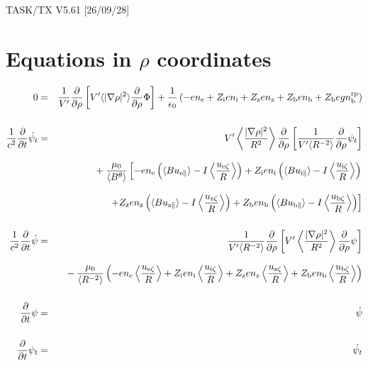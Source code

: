 \documentclass[11pt]{article}
\def\r#1{{\rm#1}}
\def\ave#1{\left\langle#1\right\rangle}
\def\aves#1{\langle#1\rangle}
\def\para{\parallel}
\def\ddrho{\frac{\partial}{\partial\rho}}
\def\ddt{\frac{\partial}{\partial t}}
\def\gradrho2{\aves{|\nabla\rho|^2}}
\def\psid{\dot{\psi}}
\def\psit{\psi_t}
\def\psitd{\dot{\psit}}
\def\nee{n_\r{e}}
\def\ni{n_\r{i}}
\def\nz{n_\r{z}}
\def\nb{n_\r{b}}
\def\Zi{Z_\r{i}}
\def\Zz{Z_\r{z}}
\def\Zb{Z_\r{b}}
\def\uzt#1{u_{\r{#1}\zeta}}
\def\upara#1{u_{\r{#1}\para}}
\def\nbrp{n_\r{b}^\r{rp}}
\begin{document}
\begin{center}
TASK/TX V5.61 [26/09/28]
\end{center}

\section{Equations in $\rho$ coordinates}
\vspace{-5mm}

%
\begin{eqnarray}
  0 &=&
%
    \frac{1}{V'} \ddrho \left[ V' \gradrho2 \ddrho{\Phi} \right]
%
  + \frac{1}{\epsilon_0}
%
    \left(-e \nee + \Zi e \ni + \Zz e \nz + \Zb e \nb + \Zb e g \nbrp \right)
\\[5mm]
  \frac{1}{c^2} \ddt \psitd &=&
%
    V' \ave{\frac{|\nabla\rho|^2}{R^2}} \ddrho \left[ \frac{1}{V'\aves{R^{-2}}}
				         \ddrho \psit \right] \nonumber\\[3mm]&&{}
%
  + \frac{\mu_0}{\aves{B^\theta}}
%
    \left[-     e \nee \left( \aves{B\upara{e}} - I\ave{\frac{\uzt{e}}{R}} \right)
          + \Zi e \ni  \left( \aves{B\upara{i}} - I\ave{\frac{\uzt{i}}{R}} \right)
    \right.\nonumber\\[3mm]&&{}
    \left.+ \Zz e \nz  \left( \aves{B\upara{z}} - I\ave{\frac{\uzt{z}}{R}} \right)
          + \Zb e \nb  \left( \aves{B\upara{b}} - I\ave{\frac{\uzt{b}}{R}} \right) \right]
\\[5mm]
  \frac{1}{c^2} \ddt \psid &=&
%
  \frac{1}{V'\aves{R^{-2}}} \ddrho \left[ V'
				    \ave{\frac{|\nabla\rho|^2}{R^2}}
				    \ddrho \psi \right] \nonumber\\[3mm]&&{}
%
  - \frac{\mu_0}{\aves{R^{-2}}} \left(-e \nee \ave{\frac{\uzt{e}}{R}}
			         + \Zi e \ni  \ave{\frac{\uzt{i}}{R}}
			         + \Zz e \nz  \ave{\frac{\uzt{z}}{R}}
			         + \Zb e \nb  \ave{\frac{\uzt{b}}{R}} \right)
%
\\[5mm]
  \ddt \psi &=&
%
  \psid
\\[5mm]
  \ddt \psit &=&
%
  \psitd
\end{eqnarray}
%

\end{document}
